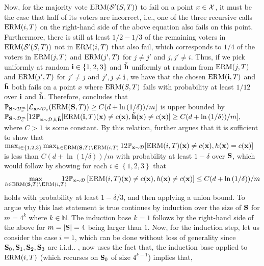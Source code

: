 Now, for the majority vote $\mathrm{ERM}(\mathcal{S}'(S,T))$ to fail on a point $x\in\mathcal{X}$, it must be the case that half of its voters are incorrect, i.e., one of the three recursive calls $\mathrm{ERM}(i,T)$ on the right-hand side of the above equation also fails on this point. Furthermore, there is still at least $1/2-1/3$ of the remaining voters in $\mathrm{ERM}(\mathcal{S}'(S,T))$ not in $\mathrm{ERM}(i,T)$ that also fail, which corresponds to $1/4$ of the voters in $\mathrm{ERM}(j,T)$ and $\mathrm{ERM}(j',T)$ for $ j\not= j' $ and $ j,j'\not=i.$ Thus, if we pick uniformly at random $\mathbf{i}\in\left\{ 1,2,3 \right\}$ and $\mathbf{\tilde{h}}$ uniformly at random from $\mathrm{ERM}(j,T)$ and $\mathrm{ERM}(j',T)$ for $j'\not=j$ and $j',j\not=\mathbf{i}$, we have that the chosen $\mathrm{ERM}(\mathbf{i},T)$ and $\mathbf{\tilde{h}}$ both fails on a point $x$ where $\mathrm{ERM}(S,T)$ fails with probability at least $1/12$ over $\mathbf{i}$ and $\mathbf{\tilde{h}}$. Therefore, \citeauthor{hannekeoptimal} concludes that 
$ \mathbb{P}_{\mathbf{S}\sim\mathcal{D}_c^m}[\operatorname{\mathcal{L}}_{\mathbf{x}\sim\mathcal{D}_{c}}(\mathrm{ERM}(\mathbf{S},T))\geq C(d+\ln{\left(1/\delta \right)})/m]$ is upper bounded by $\mathbb{P}_{\mathbf{S}\sim\mathcal{D}_c^m}[12\mathbb{P}_{\mathbf{x}\sim\mathcal{D},\mathbf{i},\mathbf{\tilde{h}}}[\mathrm{ERM}(\mathbf{i},T)(\mathbf{x})\not=c(\mathbf{x}),\mathbf{\tilde{h}}(\mathbf{x})\not=c(\mathbf{x})]\geq C(d+\ln{\left(1/\delta \right)})/m],
$ where $C>1$ is some constant. By this relation, \citeauthor{hannekeoptimal} further argues that it is sufficient to show that $
    \max_{i\in\left\{ 1,2,3 \right\}}\max_{h\in \tiny\mathrm{ERM}(\mathbf{S},T)\backslash\mathrm{ERM}(i,T)}   12\mathbb{P}_{\mathbf{x}\sim\mathcal{D}}[\mathrm{ERM}(i,T)(\mathbf{x})\not=c(\mathbf{x}),h(\mathbf{x})=c(\mathbf{x})]$ is less than $ C(d+\ln{(1/\delta )})/m $
 with probability at least $ 1-\delta $ over $\mathbf{S}$, which would follow by showing for each $i\in\left\{ 1,2,3 \right\}$ that 
\begin{align}\label{eq:intro1}
  \vspace{-0.6cm}
\max_{h\in \erm(\rS,T)\backslash\erm(i,T)} \negmedspace \negmedspace \negmedspace \negmedspace   12\p_{\rx\sim\cD}\left[\erm(i,T)(\rx)\not= c(\rx),h(\rx)\not=c(\rx)\right]\leq C(d+\ln{\left(1/\delta \right)})/m 
\end{align}
\vspace{-0.4cm}\newline holds with probability at least $1-\delta/3$, and then applying a union bound. 
To argue why this last statement is true \citeauthor{hannekeoptimal} continues by induction over the size of $\mathbf{S}$ for $m=4^{k}$ where $ k\in\mathbb{N} $. The induction base $k=1$ follows by the right-hand side of the above for $m=|\mathbf{S}|=4$ being larger than $1$. Now, for the induction step, let us consider the case $i=1$, which can be done without loss of generality since $\mathbf{S}_{0},\mathbf{S}_{1},\mathbf{S}_{2},\mathbf{S}_{3}$ are i.i.d.. \citeauthor{hannekeoptimal}, now uses the fact that, the induction base applied to $\mathrm{ERM}(i,T)$ (which recurses on $\mathbf{S}_{0}$ of size $4^{k-1}$) implies that,
